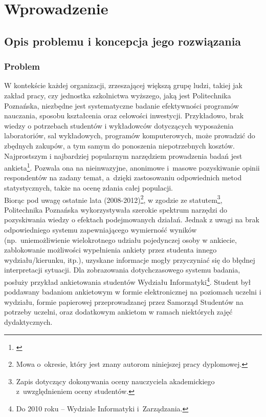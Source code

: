 \chapter{Wprowadzenie}
\label{Chapter1}

\section{Opis problemu i koncepcja jego rozwiązania}
\label{Chapter11}

\subsection{Problem}
\label{Chapter111}

W kontekście każdej organizacji, zrzeszającej większą grupę ludzi, takiej jak zakład pracy, czy jednostka szkolnictwa wyższego, jaką jest Politechnika Poznańska, niezbędne jest systematyczne badanie efektywności programów nauczania, sposobu kształcenia oraz celowości inwestycji. Przykładowo, brak wiedzy o potrzebach studentów i wykładowców dotyczących wyposażenia laboratoriów, sal wykładowych, programów komputerowych, może prowadzić do zbędnych zakupów, a tym samym do ponoszenia niepotrzebnych kosztów. Najprostszym i najbardziej popularnym narzędziem prowadzenia badań jest ankieta\footnote{\cite{Wiki:BA}\cite{IP:Awbi}}. Pozwala ona na nieinwazyjne, anonimowe i~masowe pozyskiwanie opinii respondentów na zadany temat, a~dzięki zastosowaniu odpowiednich metod statystycznych, także na ocenę zdania całej populacji. \\

Biorąc pod uwagę ostatnie lata (2008-2012)\footnote{Mowa o~okresie, który jest znany autorom niniejszej pracy dyplomowej.}, w zgodzie ze statutem\footnote{Zapis dotyczący dokonywania oceny nauczyciela akademickiego z~uwzględnieniem oceny studentów\cite{AP:SPP11}.}, Politechnika Poznańska wykorzystywała szerokie spektrum narzędzi do pozyskiwania wiedzy o efektach podejmowanych działań. Jednak z uwagi na brak odpowiedniego systemu zapewniającego wymierność wyników (np.~uniemożliwienie wielokrotnego udziału pojedynczej osoby w ankiecie, zablokowanie możliwości wypełnienia ankiety przez studenta innego wydziału\slash kierunku, itp.), uzyskane informacje mogły przyczyniać się do błędnej interpretacji sytuacji. Dla zobrazowania dotychczasowego systemu badania, posłuży przykład ankietowania studentów Wydziału Informatyki\footnote{Do 2010 roku -- Wydziale Informatyki i~Zarządzania.}. Student był poddawany badaniom ankietowym w formie elektronicznej na poziomach uczelni i wydziału, formie papierowej przeprowadzanej przez Samorząd Studentów na potrzeby uczelni, oraz dodatkowym ankietom w ramach niektórych zajęć dydaktycznych. \\

